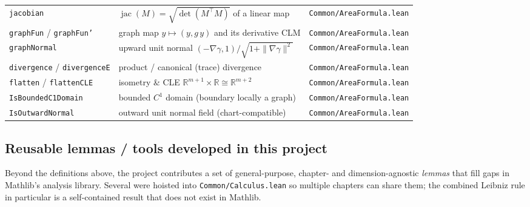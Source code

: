 ﻿\documentclass[12pt, a4paper]{article}
\renewcommand{\_}{\origunderscore\allowbreak}
\theoremstyle{definition}
\theoremstyle{plain}
\begin{document}
\begin{longtable}{@{}L{4.5cm}L{6.8cm}L{3.5cm}@{}}
  \texttt{jacobian}                 & $\operatorname{jac}(M)=\sqrt{\det(M^{\!\top}M)}$ of a linear map & \texttt{Common/\allowbreak AreaFormula.\allowbreak lean} \\
  \texttt{graphFun} / \texttt{graphFun'} & graph map $y\mapsto(y,g\,y)$ and its derivative CLM & \texttt{Common/\allowbreak AreaFormula.\allowbreak lean} \\
  \texttt{graphNormal}              & upward unit normal $(-\nabla\gamma,1)/\sqrt{1+\|\nabla\gamma\|^2}$ & \texttt{Common/\allowbreak AreaFormula.\allowbreak lean} \\
  \texttt{divergence} / \texttt{divergenceE} & product / canonical (trace) divergence & \texttt{Common/\allowbreak AreaFormula.\allowbreak lean} \\
  \texttt{flatten} / \texttt{flattenCLE} & isometry \& CLE $\mathbb{R}^{m+1}\!\times\!\mathbb{R}\cong\mathbb{R}^{m+2}$ & \texttt{Common/\allowbreak AreaFormula.\allowbreak lean} \\
  \texttt{IsBoundedC1Domain}        & bounded $C^1$ domain (boundary locally a graph) & \texttt{Common/\allowbreak AreaFormula.\allowbreak lean} \\
  \texttt{IsOutwardNormal}          & outward unit normal field (chart-compatible) & \texttt{Common/\allowbreak AreaFormula.\allowbreak lean} \\
  \bottomrule
\end{longtable}

\subsection{Reusable lemmas / tools developed in this project}

Beyond the definitions above, the project contributes a set of general-purpose, chapter- and
dimension-agnostic \emph{lemmas} that fill gaps in Mathlib's analysis library. Several were
hoisted into \texttt{Common/\allowbreak Calculus.\allowbreak lean} so multiple chapters can share them; the combined Leibniz
rule in particular is a self-contained result that does not exist in Mathlib.
\end{document}
